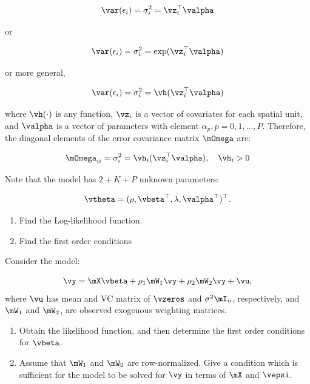 \documentclass[english,12pt]{book}\usepackage[]{graphicx}\usepackage[]{xcolor}
\begin{document}
\begin{exercises}
	\begin{equation}
		\var(\epsilon_i) = \sigma^2_i = \vz_i^\top\valpha
	\end{equation}
	
	or
	
	\begin{equation}
		\var(\epsilon_i) = \sigma^2_i = \exp(\vz_i^\top\valpha)
	\end{equation}
	
	or more general,
	
	\begin{equation}
		\var(\epsilon_i) = \sigma^2_i = \vh(\vz_i^\top\valpha)
	\end{equation}
	
	where $\vh(\cdot)$ is any function, $\vz_i$ is a vector of covariates for each spatial unit, and $\valpha$ is a vector of parameters with element $\alpha_p, p = 0, 1,..., P$.  Therefore, the diagonal elements of the error covariance  matrix $\mOmega$ are:
	
	
	\begin{equation}
		\mOmega_{ii} = \sigma^2_i = \vh_i(\vz^\top_i\valpha), \quad \vh_i > 0
	\end{equation}
	
	Note that the model has $2 + K + P$ unknown parameters:
	
	\begin{equation}
		\vtheta = (\rho, \vbeta^\top, \lambda, \valpha^\top)^\top.
	\end{equation}
	
   \begin{enumerate}
     \item Find the Log-likelihood function.
     \item Find the first order conditions
   \end{enumerate}
 
 \exercise Consider the model:

\begin{equation}
	\vy = \mX\vbeta + \rho_1\mW_1\vy + \rho_2\mW_2\vy + \vu,
\end{equation}
%
where $\vu$ has mean and VC matrix of $\vzeros$ and $\sigma^2\mI_n$, respectively, and $\mW_1$ and $\mW_2$, are observed exogenous weighting matrices. 
   \begin{enumerate}
    \item Obtain the likelihood function, and then determine the first order conditions for $\vbeta$.
    \item Assume that $\mW_1$ and $\mW_2$ are row-normalized. Give a condition which is sufficient for the model to be solved for $\vy$ in terms of $\mX$ and $\vepsi$.
   \end{enumerate}
   

\end{exercises}
\end{document}
